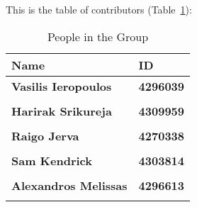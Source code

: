 This is the table of contributors (Table~\ref{authors}):
\begin{table}%
\centering
\caption{People in the Group}
\label{authors}
\begin{tabular}{|l|l|}
\textbf{Name} & \textbf{ID} \\
\hline
\textbf{Vasilis Ieropoulos} & \textbf{4296039} \\
\hline 
& \\
\textbf{Harirak Srikureja} & \textbf{4309959} \\
\hline
& \\
\textbf{Raigo Jerva} & \textbf{4270338} \\
\hline
& \\
\textbf{Sam Kendrick} & \textbf{4303814} \\
\hline
& \\
\textbf{Alexandros Melissas} & \textbf{4296613} \\
\hline
& \\
\hline
\end{tabular}
\end{table}
